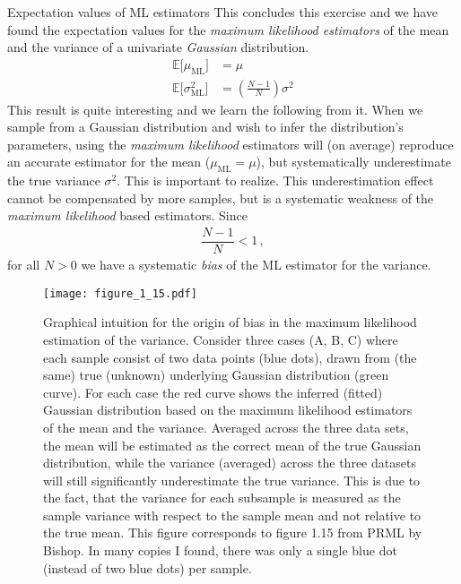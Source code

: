 \documentclass[11pt,DINA4, fleqn]{amsart}
\begin{document}
\begin{mybox_tc3}{Expectation values of ML estimators}
This concludes this exercise and we have found the expectation values for the \emph{maximum likelihood estimators} of the mean and the variance of a univariate \emph{Gaussian} distribution.
\begin{align}
\mathbb{E}\bigl[\mu_{\text{ML}}\bigl] &= \mu \\
\mathbb{E}\bigl[\sigma^2_{\text{ML}}\bigl] &= \left(\frac{N - 1}{N}\right) \sigma^2
\end{align}
This result is quite interesting and we learn the following from it. When we sample from a Gaussian distribution and wish to infer the distribution's parameters, using the \emph{maximum likelihood} estimators will (on average) reproduce an accurate estimator for the mean ($\mu_{\text{ML}}= \mu$), but systematically underestimate the true variance $\sigma^2$. This is important to realize. This underestimation effect cannot be compensated by more samples, but is a systematic weakness of the \emph{maximum likelihood} based estimators.
Since
\begin{align}
\dfrac{N-1}{N} < 1 \, ,
\end{align}
for all $N > 0$ we have a systematic \emph{bias} of the ML estimator for the variance.
\end{mybox_tc3}

\begin{figure}[h]
	\centering
	\texttt{[image: figure\_1\_15.pdf]}
	\caption{Graphical intuition for the origin of bias in the maximum likelihood estimation of the variance. Consider three cases (A, B, C) where each sample consist of two data points (blue dots), drawn from (the same) true (unknown) underlying Gaussian distribution (green curve). For each case the red curve shows the inferred (fitted) Gaussian distribution based on the maximum likelihood estimators of the mean and the variance. Averaged across the three data sets, the mean will be estimated as the correct mean of the true Gaussian distribution, while the variance (averaged) across the three datasets will still significantly underestimate the true variance. This is due to the fact, that the variance for each subsample is measured as the sample variance with respect to the sample mean and not relative to the true mean. This figure corresponds to figure 1.15 from PRML by Bishop. In many copies I found, there was only a single blue dot (instead of two blue dots) per sample.
	\label{fig:figure_1.15}}
\end{figure}
\end{document}
